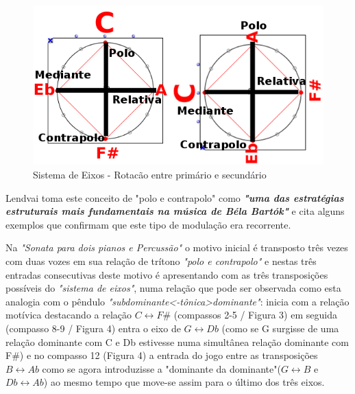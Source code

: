 \documentclass[
	12pt,				%
	openright,			%
	twoside,			%
	a4paper,			%
	english,			%
	french,				%
	spanish,			%
	brazil				%
	]{abntex2}
\begin{document}
\begin{figure}[!h]
	\caption{\label{fig_grafico}Sistema de Eixos - Rotacão entre primário e secundário}
	\begin{center}
	    \includegraphics[scale=0.4]{axis/PoloContrapolo.png}
	\end{center}
\end{figure}


Lendvai toma este conceito de "polo e contrapolo" como \textit{\textbf{"uma das estratégias estruturais mais fundamentais na música de Béla Bartók"}}\cite[ p.04]{lendvai1971bela} e cita alguns exemplos que confirmam que este tipo de modulação era recorrente.

 
Na \textit{"Sonata para dois pianos e Percussão"} o motivo inicial é transposto três vezes com duas vozes em sua relação de trítono \textit{"polo e contrapolo"} e nestas três entradas consecutivas deste motivo é apresentando com as três transposições possíveis do \textit{"sistema de eixos"}, numa relação que pode ser observada como esta analogia com o pêndulo \textit{"subdominante<-tônica>dominante"}: inicia com a relação motívica destacando a relação $C \leftrightarrow F\#$ (compassos 2-5 / Figura 3) em seguida (compasso 8-9 / Figura 4) entra o eixo de $G \leftrightarrow Db$ (como se G surgisse de uma relação dominante com C e Db estivesse numa simultânea relação dominante com F\#) e no compasso 12 (Figura 4) a entrada do jogo entre as transposições $B \leftrightarrow Ab$ como se agora introduzisse a "dominante da dominante"($G \leftrightarrow B$ e $Db \leftrightarrow Ab$) ao mesmo tempo que move-se assim para o último dos três eixos.
\end{document}

